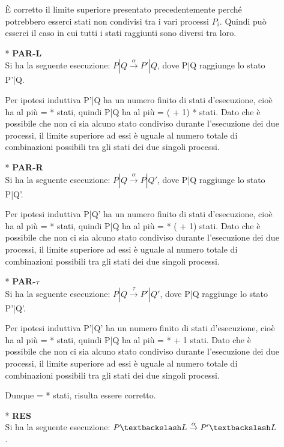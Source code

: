 \begin{itemize}
\begin{itemize}
		È corretto il limite superiore presentato precedentemente perché potrebbero esserci stati non condivisi tra i vari processi $P_{i}$. Quindi può esserci il caso in cui tutti i stati raggiunti sono diversi tra loro.
		\\
		\item[*] \textbf{PAR-L}
		\\
		Si ha la seguente esecuzione: $P|Q \overset{\alpha}\rightarrow P'|Q$, dove P|Q raggiunge lo stato P'|Q.
		
		Per ipotesi induttiva P'|Q ha un numero finito di stati d'esecuzione, cioè ha al più  =  *  stati, quindi P|Q ha al più  = ( + 1) *  stati. Dato che è possibile che non ci sia alcuno stato condiviso durante l'esecuzione dei due processi, il limite superiore ad essi è uguale al numero totale di combinazioni possibili tra gli stati dei due singoli processi.	
		\\
		\item[*] \textbf{PAR-R}
		\\
		Si ha la seguente esecuzione: $P|Q \overset{\alpha}\rightarrow P|Q'$, dove P|Q raggiunge lo stato P|Q'.
		
		Per ipotesi induttiva P|Q' ha un numero finito di stati d'esecuzione, cioè ha al più  =  *  stati, quindi P|Q ha al più  =  * ( + 1) stati. Dato che è possibile che non ci sia alcuno stato condiviso durante l'esecuzione dei due processi, il limite superiore ad essi è uguale al numero totale di combinazioni possibili tra gli stati dei due singoli processi.
		\\
		\item[*] \textbf{PAR-$\tau$}
		\\
		Si ha la seguente esecuzione: $P|Q \overset{\tau}\rightarrow P'|Q'$, dove P|Q raggiunge lo stato P'|Q'.
		
		Per ipotesi induttiva P'|Q' ha un numero finito di stati d'esecuzione, cioè ha al più  =  *  stati, quindi P|Q ha al più  =  *  + 1 stati. Dato che è possibile che non ci sia alcuno stato condiviso durante l'esecuzione dei due processi, il limite superiore ad essi è uguale al numero totale di combinazioni possibili tra gli stati dei due singoli processi.
		
		Dunque  =  *  stati, risulta essere corretto.
		\\
		\item[*] \textbf{RES}
		\\
		Si ha la seguente esecuzione: $P \textbackslash L \overset{\alpha}\rightarrow P' \textbackslash L$. 
		

\end{itemize}
\end{itemize}
